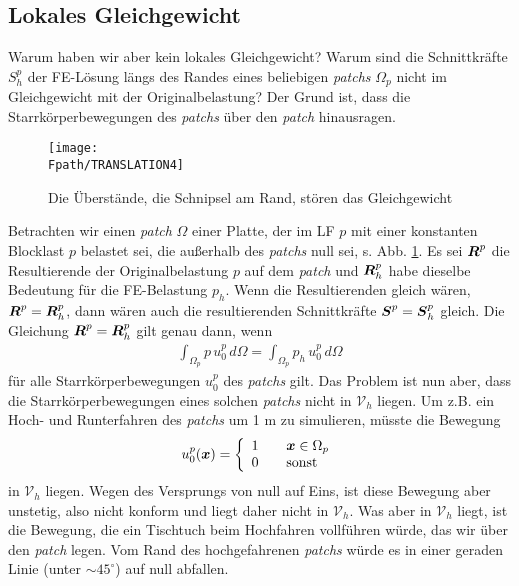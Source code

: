 {\textcolor{sectionTitleBlue}{\subsection{Lokales Gleichgewicht}}}
{\small Warum haben wir aber kein lokales Gleichgewicht? Warum sind die Schnittkr\"{a}fte $S_h^p$ der FE-L\"{o}sung l\"{a}ngs des Randes eines beliebigen {\em patchs\/} $\Omega_p$ nicht im Gleichgewicht mit der Originalbelastung? Der Grund ist, dass die Starrk\"{o}rperbewegungen des {\em patchs\/} \"{u}ber den {\em patch\/} hinausragen.
\begin{figure}[tbp] \centering
\if {} \sidecaption \fi
\texttt{[image: \\Fpath/TRANSLATION4]}
\caption{Die \"{U}berst\"{a}nde, die Schnipsel am Rand, st\"{o}ren das Gleichgewicht}
\label{Translation4}
\end{figure}%

Betrachten wir einen {\em patch\/} $\Omega$ einer Platte, der im LF $p$ mit einer konstanten Blocklast $p$ belastet sei, die au{\ss}erhalb des {\em patchs\/} null sei, s. Abb. \ref{Translation4}. Es sei $\vek R^p$ die Resultierende der Originalbelastung $p$ auf dem {\em patch\/} und $\vek R_h^p$ habe dieselbe Bedeutung f\"{u}r die FE-Belastung $p_h$. Wenn die Resultierenden gleich w\"{a}ren, $\vek R^p = \vek R_h^p$, dann w\"{a}ren auch die resultierenden Schnittkr\"{a}fte $\vek S^p = \vek S_h^p$ gleich. Die Gleichung $\vek R^p = \vek R_h^p$ gilt genau dann, wenn
\begin{align}
\int_{\Omega_p} p \,u_0^p\,d\Omega = \int_{\Omega_p} p_h \,u_0^p\,d\Omega
\end{align}
f\"{u}r alle Starrk\"{o}rperbewegungen $u_0^p$ des {\em patchs\/} gilt. Das Problem ist nun aber, dass die Starrk\"{o}rperbewegungen eines solchen {\em patchs\/} nicht in $\mathcal{V}_h$ liegen. Um z.B. ein Hoch- und Runterfahren des {\em patchs\/} um 1 m zu simulieren, m\"{u}sste die Bewegung
\begin{align}
u_0^p(\vek x) = \left \{ \barr {l} 1 \qquad \vek x \in \Omega_p \\
0 \qquad \mbox{sonst} \earr \right.
\end{align}
in $\mathcal{V}_h$ liegen. Wegen des Versprungs von null auf Eins, ist diese Bewegung aber unstetig, also nicht konform und liegt daher nicht in $\mathcal{V}_h$. Was aber in $\mathcal{V}_h$ liegt, ist die Bewegung, die ein Tischtuch beim Hochfahren vollf\"{u}hren w\"{u}rde, das wir \"{u}ber den {\em patch\/} legen. Vom Rand des hochgefahrenen {\em patchs\/} w\"{u}rde es in einer geraden Linie (unter $\sim 45^\circ$) auf null abfallen.

}
